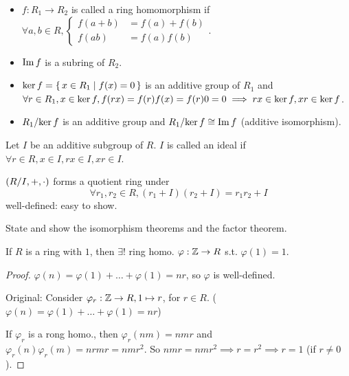 \begin{definition} \mbox{}
  \begin{itemize}
    \item $f: R_1 \to R_2$ is called a ring homomorphism if
      $\forall a, b \in R, \begin{cases}
        f(a+b) &= f(a) + f(b) \\
        f(ab) &= f(a)f(b)
      \end{cases}$.
    \item $\operatorname{Im} f$ is a subring of $R_2$.
    \item $\operatorname{ker} f = \{\, x \in R_1 \mid f(x) = 0 \,\}$ is an additive group of
      $R_1$ and $\forall r \in R_1, x \in \operatorname{ker} f, f(rx) = f(r)f(x) = f(r)0 = 0
      \implies rx \in \operatorname{ker} f, xr \in \operatorname{ker} f$.
    \item ${R_1}/{\operatorname{ker} f}$ is an additive group and
      ${R_1}/{\operatorname{ker} f} \cong \operatorname{Im} f$ (additive isomorphism).
  \end{itemize}
\end{definition}

\begin{definition}
  Let $I$ be an additive subgroup of $R$.
  $I$ is called an ideal if $\forall r \in R, x \in I, rx \in I, xr \in I$.

  $\left({R}/{I}, +, \cdot \right)$ forms a quotient ring under
  \[ \forall r_1, r_2 \in R, (r_1+I)(r_2+I) = r_1r_2 + I \]
  well-defined: easy to show.
\end{definition}

\begin{exercise}
  State and show the isomorphism theorems and the factor theorem.
\end{exercise}

\begin{prop}
  If $R$ is a ring with $1$, then $\exists!$ ring homo. $\varphi: \mathbb{Z} \to R$
  s.t. $\varphi(1) = 1$.
  \begin{proof}
    $\varphi(n) = \varphi(1) + \dots + \varphi(1) = nr$, so $\varphi$ is
    well-defined.

    Original:
    Consider $\varphi_r: \mathbb{Z} \to R, 1 \mapsto r$, for $r \in R$.
    ($\varphi(n) = \varphi(1) + \dots + \varphi(1) = nr$)

    If $\varphi_r$ is a rong homo., then $\varphi_r(nm) = nmr$ and
    $\varphi_r(n)\varphi_r(m) = nrmr = nmr^2$.
    So $nmr = nmr^2 \implies r = r^2 \implies r = 1$ (if $r \ne 0$).
  \end{proof}
  \label{prop:phi1e1}
\end{prop}

